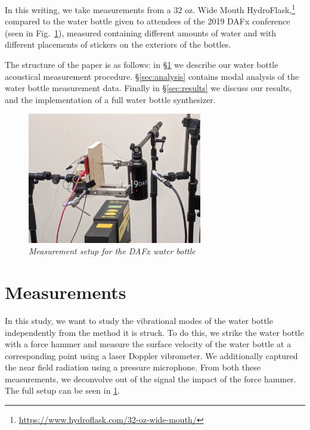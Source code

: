 \documentclass[twoside,a4paper]{article}
\begin{document}

In this writing, we take measurements from a 32 oz. Wide Mouth
HydroFlask,\footnote{\url{https://www.hydroflask.com/32-oz-wide-mouth/}}
compared to the water bottle given to attendees of the 2019 DAFx
conference (seen in Fig.~\ref{fig:dafx_measure}), measured containing different amounts of water and with different placements of stickers on the exteriors of the
bottles.

The structure of the paper is as follows: in \S\ref{sec:measure} we describe
our water bottle acoustical measurement procedure. \S\ref{sec:analysis}
contains modal analysis of the water bottle measurement data.
Finally in \S\ref{sec:results} we discuss our results, and the
implementation of a full water bottle synthesizer.


\begin{figure}[!t]
    \centering
    \includegraphics[width=3in]{Figures/dafx_measure}
    \caption{\it{Measurement setup for the DAFx water bottle}}
    \label{fig:dafx_measure}
\end{figure}

\section{Measurements} \label{sec:measure}
%
In this study, we want to study the vibrational modes of the water bottle independently from the method it is struck. To do this, we strike the water bottle with a force hammer and measure the surface velocity of the water bottle at a corresponding point using a laser Doppler vibrometer. We additionally captured the near field radiation using a pressure microphone. From both these measurements, we deconvolve out of the signal the impact of the force hammer. The full setup can be seen in \cref{fig:dafx_measure}.
\end{document}
